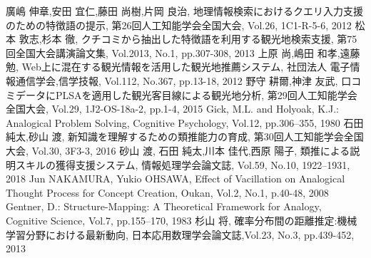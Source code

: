 \documentclass[journal]{IAENGtran}
\begin{document}

%
%
%
\begin{thebibliography}{1}

    廣嶋 伸章,安田 宜仁,藤田 尚樹,片岡 良治,
      地理情報検索におけるクエリ入力支援のための特徴語の提示,
      第26回人工知能学会全国大会, Vol.26, 1C1-R-5-6, 2012
    松本 敦志,杉本 徹,
      クチコミから抽出した特徴語を利用する観光地検索支援,
      第75回全国大会講演論文集, Vol.2013, No.1, pp.307-308, 2013
    上原 尚,嶋田 和孝,遠藤 勉,
      Web上に混在する観光情報を活用した観光地推薦システム,
      社団法人 電子情報通信学会,信学技報, Vol.112, No.367, pp.13-18, 2012
    野守 耕爾,神津 友武,
      口コミデータにPLSAを適用した観光客目線による観光地分析,
      第29回人工知能学会全国大会, Vol.29, 1J2-OS-18a-2, pp.1-4, 2015
    Gick, M.L. and Holyoak, K.J.:
    Analogical Problem Solving,
    Cognitive Psychology, Vol.12, pp.306–355, 1980
    石田 純太,砂山 渡,
      新知識を理解するための類推能力の育成,
      第30回人工知能学会全国大会, Vol.30, 3F3-3, 2016
    砂山 渡, 石田 純太,川本 佳代,西原 陽子,
      類推による説明スキルの獲得支援システム,
      情報処理学会論文誌, Vol.59, No.10, 1922–1931, 2018
    Jun NAKAMURA, Yukio OHSAWA,
      Effect of Vacillation on Analogical Thought Process for Concept Creation,
      Oukan, Vol.2, No.1, p.40-48, 2008
    Gentner, D.: Structure-Mapping:
    A Theoretical Framework for Analogy,
    Cognitive Science, Vol.7, pp.155–170, 1983
    杉山 将,
      確率分布間の距離推定:機械学習分野における最新動向,
      日本応用数理学会論文誌,Vol.23, No.3, pp.439-452, 2013

\end{thebibliography}
\end{document}
